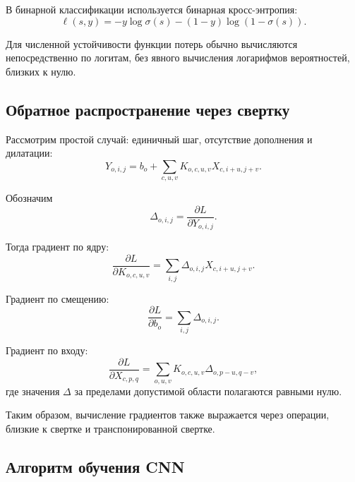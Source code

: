 \documentclass[12pt,a4paper]{article}
\numberwithin{equation}{section}
\theoremstyle{definition}
\theoremstyle{remark}
\begin{document}
В бинарной классификации используется бинарная кросс-энтропия:
\[
    \ell(s,y)
    =
    -y\log\sigma(s)
    -(1-y)\log(1-\sigma(s)).
\]

Для численной устойчивости функции потерь обычно вычисляются
непосредственно по логитам, без явного вычисления логарифмов
вероятностей, близких к нулю.

\subsection{Обратное распространение через свертку}

Рассмотрим простой случай: единичный шаг, отсутствие дополнения и
дилатации:
\[
    Y_{o,i,j}
    =
    b_o+
    \sum_{c,u,v}
    K_{o,c,u,v}X_{c,i+u,j+v}.
\]

Обозначим
\[
    \Delta_{o,i,j}
    =
    \frac{\partial L}{\partial Y_{o,i,j}}.
\]

Тогда градиент по ядру:
\[
    \frac{\partial L}{\partial K_{o,c,u,v}}
    =
    \sum_{i,j}
    \Delta_{o,i,j}X_{c,i+u,j+v}.
\]

Градиент по смещению:
\[
    \frac{\partial L}{\partial b_o}
    =
    \sum_{i,j}\Delta_{o,i,j}.
\]

Градиент по входу:
\[
    \frac{\partial L}{\partial X_{c,p,q}}
    =
    \sum_{o,u,v}
    K_{o,c,u,v}
    \Delta_{o,p-u,q-v},
\]
где значения \(\Delta\) за пределами допустимой области полагаются
равными нулю.

Таким образом, вычисление градиентов также выражается через операции,
близкие к свертке и транспонированной свертке.

\subsection{Алгоритм обучения CNN}
\end{document}
